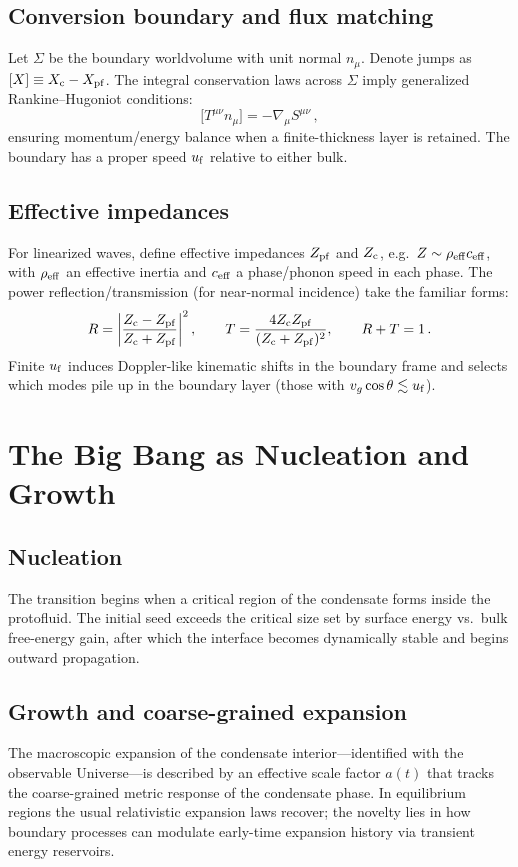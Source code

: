 \documentclass[11pt,a4paper]{article}
\begin{document}
\subsection{Conversion boundary and flux matching}
Let $\Sigma$ be the boundary worldvolume with unit normal $n_\mu$. Denote jumps as $[X]\equiv X_{\rm c}-X_{\rm pf}$. The integral conservation laws across $\Sigma$ imply generalized Rankine--Hugoniot conditions:
\begin{equation}
\big[T^{\mu\nu} n_\mu\big] = - \nabla_\mu S^{\mu\nu}\,,
\end{equation}
ensuring momentum/energy balance when a finite-thickness layer is retained. The boundary has a proper speed $u_{\rm f}$ relative to either bulk.

\subsection{Effective impedances}
For linearized waves, define effective impedances $Z_{\rm pf}$ and $Z_{\rm c}$, e.g.\ $Z\sim \rho_{\rm eff} c_{\rm eff}$, with $\rho_{\rm eff}$ an effective inertia and $c_{\rm eff}$ a phase/phonon speed in each phase. The power reflection/transmission (for near-normal incidence) take the familiar forms:
\begin{equation}
R=\left|\frac{Z_{\rm c}-Z_{\rm pf}}{Z_{\rm c}+Z_{\rm pf}}\right|^{2},\qquad
T=\frac{4 Z_{\rm c} Z_{\rm pf}}{(Z_{\rm c}+Z_{\rm pf})^{2}},\qquad R+T=1\,.
\label{eq:RT}
\end{equation}
Finite $u_{\rm f}$ induces Doppler-like kinematic shifts in the boundary frame and selects which modes pile up in the boundary layer (those with $v_g \cos\theta \lesssim u_{\rm f}$).

\section{The Big Bang as Nucleation and Growth}
\subsection{Nucleation}
The transition begins when a critical region of the condensate forms inside the protofluid. The initial seed exceeds the critical size set by surface energy vs.\ bulk free-energy gain, after which the interface becomes dynamically stable and begins outward propagation.

\subsection{Growth and coarse-grained expansion}
The macroscopic expansion of the condensate interior---identified with the observable Universe---is described by an effective scale factor $a(t)$ that tracks the coarse-grained metric response of the condensate phase. In equilibrium regions the usual relativistic expansion laws recover; the novelty lies in how boundary processes can modulate early-time expansion history via transient energy reservoirs.
\end{document}
